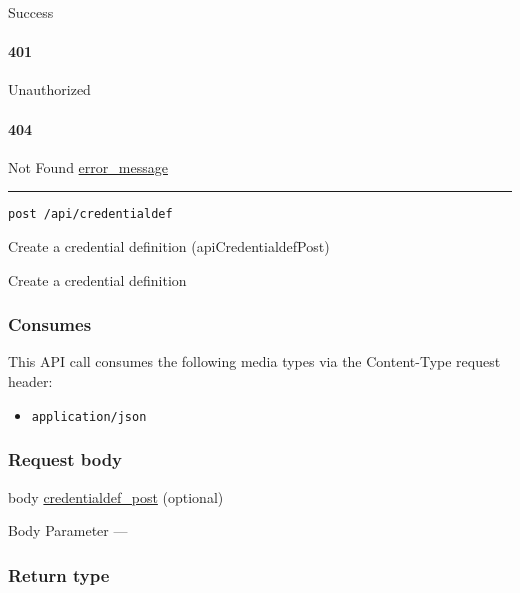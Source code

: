 Success

\hypertarget{section-207}{%
\paragraph{401}\label{section-207}}

Unauthorized \protect\hyperlink{}{}

\hypertarget{section-208}{%
\paragraph{404}\label{section-208}}

Not Found \protect\hyperlink{error_message}{error\_message}

\begin{center}\rule{0.5\linewidth}{\linethickness}\end{center}

\protect\hypertarget{apiCredentialdefPost}{}{}

\begin{verbatim}
post /api/credentialdef
\end{verbatim}

Create a credential definition ({apiCredentialdefPost})

Create a credential definition

\hypertarget{consumes-20}{%
\subsubsection{Consumes}\label{consumes-20}}

This API call consumes the following media types via the {Content-Type}
request header:

\begin{itemize}
\tightlist
\item
  \texttt{application/json}
\end{itemize}

\hypertarget{request-body-20}{%
\subsubsection{Request body}\label{request-body-20}}

body \protect\hyperlink{credentialdef_post}{credentialdef\_post}
(optional)

{Body Parameter} ---

\hypertarget{return-type-51}{%
\subsubsection{Return type}\label{return-type-51}}

